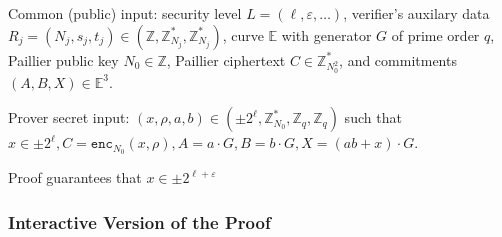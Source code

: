 \documentclass[11pt]{article}
\newcommand{\enc}{\ensuremath{\mathtt{enc}}}
\newcommand{\E}{\mathbb{E}}
\newcommand{\Z}{\mathbb{Z}}
\newcommand{\?}[1]{\stackrel{?}{#1}}
\begin{document}
Common (public) input:
    security level $L = (\ell, \varepsilon, \dots)$,
    verifier's auxilary data $R_j = (N_j, s_j, t_j) \in (\Z, \Z^*_{N_j}, \Z^*_{N_j})$,
    curve $\E$ with generator $G$ of prime order $q$,
    Paillier public key $N_0 \in \Z$,
    Paillier ciphertext $C \in \Z^*_{N_0^2}$,
    and commitments $(A, B, X) \in \E^3$.


Prover secret input: $(x, \rho, a, b) \in (\pm 2^\ell, \Z^*_{N_0}, \Z_q, \Z_q)$ such that
    $x \in \pm 2^\ell,
    C = \enc_{N_0}(x, \rho),
    A = a \cdot G,
    B = b \cdot G,
    X = (ab + x) \cdot G$.

Proof guarantees that $x \in \pm 2^{\ell + \varepsilon}$

\subsubsection{Interactive Version of the Proof}
\end{document}
